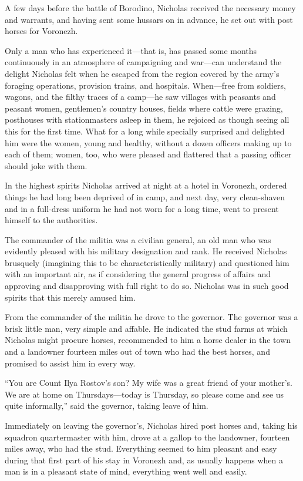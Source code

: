 A few days before the battle of Borodino, Nicholas received the
necessary money and warrants, and having sent some hussars on in
advance, he set out with post horses for Voronezh.

Only a man who has experienced it---that is, has passed some
months continuously in an atmosphere of campaigning and war---can
understand the delight Nicholas felt when he escaped from the
region covered by the army's foraging operations, provision
trains, and hospitals. When---free from soldiers, wagons, and the
filthy traces of a camp---he saw villages with peasants and
peasant women, gentlemen's country houses, fields where cattle
were grazing, posthouses with stationmasters asleep in them, he
rejoiced as though seeing all this for the first time. What for a
long while specially surprised and delighted him were the women,
young and healthy, without a dozen officers making up to each of
them; women, too, who were pleased and flattered that a passing
officer should joke with them.

In the highest spirits Nicholas arrived at night at a hotel in
Voronezh, ordered things he had long been deprived of in camp,
and next day, very clean-shaven and in a full-dress uniform he
had not worn for a long time, went to present himself to the
authorities.

The commander of the militia was a civilian general, an old man
who was evidently pleased with his military designation and
rank. He received Nicholas brusquely (imagining this to be
characteristically military) and questioned him with an important
air, as if considering the general progress of affairs and
approving and disapproving with full right to do so. Nicholas was
in such good spirits that this merely amused him.

From the commander of the militia he drove to the governor. The
governor was a brisk little man, very simple and affable. He
indicated the stud farms at which Nicholas might procure horses,
recommended to him a horse dealer in the town and a landowner
fourteen miles out of town who had the best horses, and promised
to assist him in every way.

``You are Count Ilya Rostov's son? My wife was a great friend of
your mother's. We are at home on Thursdays---today is Thursday,
so please come and see us quite informally,'' said the governor,
taking leave of him.

Immediately on leaving the governor's, Nicholas hired post horses
and, taking his squadron quartermaster with him, drove at a
gallop to the landowner, fourteen miles away, who had the
stud. Everything seemed to him pleasant and easy during that
first part of his stay in Voronezh and, as usually happens when a
man is in a pleasant state of mind, everything went well and
easily.

